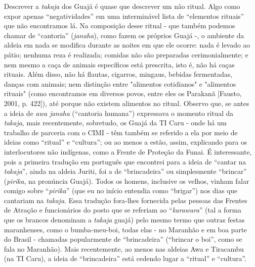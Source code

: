 Descrever a \emph{takaja} dos Guajá é quase que descrever um não ritual.
Algo como expor apenas ``negatividades'' em uma interminável lista de
``elementos rituais'' que não encontramos lá. Na composição desse ritual
- que também podemos chamar de ``cantoria'' (\emph{janaha}), como fazem
os próprios Guajá -, o ambiente da aldeia em nada se modifica durante as
noites em que ele ocorre: nada é levado ao pátio; nenhuma reza é
realizada; comidas não são preparadas cerimonialmente; e nem mesmo a
caça de animais específicos está prescrita, isto é, não há caças
rituais. Além disso, não há flautas, cigarros, mingaus, bebidas
fermentadas, danças com animais; nem distinção entre "alimentos
cotidianos" e "alimentos rituais" (como encontramos em diversos povos,
entre eles os Parakanã {[}Fausto, 2001, p. 422{]}), até porque não
existem alimentos no ritual. Observo que, se antes a ideia de \emph{awa
janaha} (``cantoria humana'') expressava o momento ritual da
\emph{takaja}, mais recentemente, sobretudo, os Guajá da TI Caru - onde
há um trabalho de parceria com o CIMI - têm também se referido a ela por
meio de ideias como ``ritual'' e ``cultura''; ou ao menos a estão,
assim, explicando para os interlocutores não indígenas, como a Frente de
Proteção da Funai. É interessante, pois a primeira tradução em português
que encontrei para a ideia de ``cantar na \emph{takaja}'', ainda na
aldeia Juriti, foi a de ``brincadeira'' ou simplesmente ``brincar''
(\emph{pirika}, na pronúncia Guajá). Todos os homens, inclusive os
velhos, vinham falar comigo sobre ``\emph{pirika}'' (que eu no início
entendia como ``brigar'') nos dias que cantariam na \emph{takaja}. Essa
tradução fora-lhes fornecida pelas pessoas das Frentes de Atração e
funcionários do posto que se referiam ao ``\emph{karawara}'' (tal a
forma que os brancos denominam a \emph{takaja} guajá) pelo mesmo termo
que outras festas maranhenses, como o bumba-meu-boi, todas elas - no
Maranhão e em boa parte do Brasil - chamadas popularmente de
``brincadeira'' (``brincar o boi'', como se fala no Maranhão). Mais
recentemente, ao menos nas aldeias Awa e Tiracambu (na TI Caru), a ideia
de ``brincadeira'' está cedendo lugar a ``ritual'' e ``cultura''.

